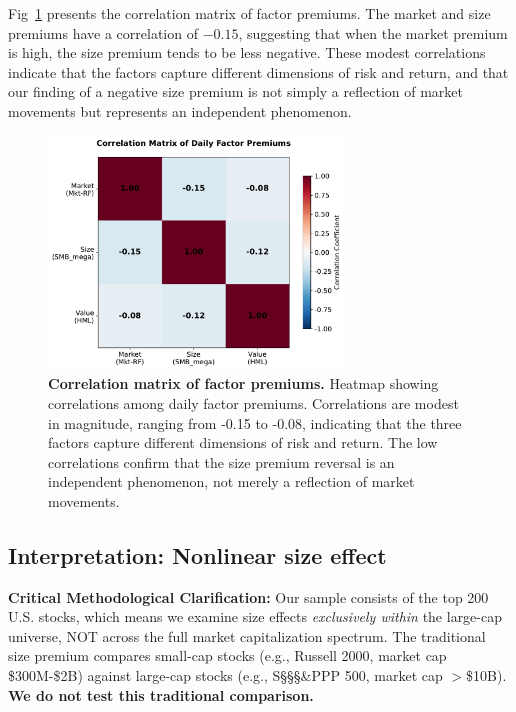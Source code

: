 \documentclass[10pt,letterpaper]{article}
\begin{document}
Fig~\ref{fig:correlation} presents the correlation matrix of factor premiums. The market and size premiums have a correlation of $-0.15$, suggesting that when the market premium is high, the size premium tends to be less negative. These modest correlations indicate that the factors capture different dimensions of risk and return, and that our finding of a negative size premium is not simply a reflection of market movements but represents an independent phenomenon.

\begin{figure}[!h]
\centering
\includegraphics[width=0.7\textwidth]{figures/fig5_correlation_matrix.pdf}
\caption{\textbf{Correlation matrix of factor premiums.}
Heatmap showing correlations among daily factor premiums. Correlations are modest in magnitude, ranging from -0.15 to -0.08, indicating that the three factors capture different dimensions of risk and return. The low correlations confirm that the size premium reversal is an independent phenomenon, not merely a reflection of market movements.}
\label{fig:correlation}
\end{figure}

\subsection*{Interpretation: Nonlinear size effect}

\textbf{Critical Methodological Clarification:} Our sample consists of the top 200 U.S. stocks, which means we examine size effects \textit{exclusively within} the large-cap universe, NOT across the full market capitalization spectrum. The traditional size premium compares small-cap stocks (e.g., Russell 2000, market cap \$300M-\$2B) against large-cap stocks (e.g., S\S\S\S\&PPP 500, market cap $>$\$10B). \textbf{We do not test this traditional comparison.}
\end{document}
